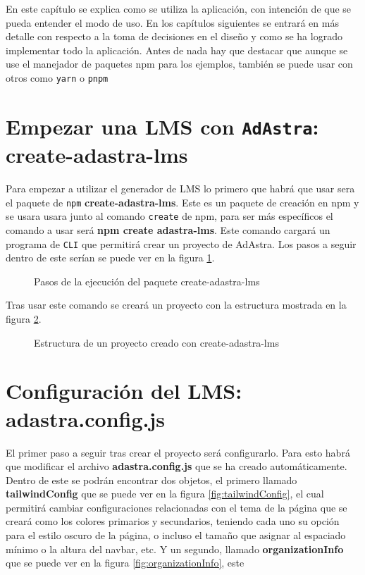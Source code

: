 En este capítulo se explica como se utiliza la aplicación, con intención de que se pueda entender el modo de uso. En los capítulos siguientes se entrará en más detalle con respecto a la toma de decisiones en el diseño y como se ha logrado implementar todo la aplicación. Antes de nada hay que destacar que aunque se use el manejador de paquetes npm para los ejemplos, también se puede usar con otros como \verb|yarn|\cite{yarn} o \verb|pnpm|\cite{pnpm}

\section{Empezar una LMS con {\tt AdAstra}: create-adastra-lms}

Para empezar a utilizar el generador de LMS lo primero que habrá que usar sera el paquete de \verb|npm|\cite{npm} \textbf{create-adastra-lms}. Este es un paquete de creación en npm y se usara usara junto al comando \verb|create|\cite{create-npm} de npm, para ser más específicos el comando a usar será \textbf{npm create adastra-lms}. Este comando cargará un programa de \verb|CLI|\cite{cli} que permitirá crear un proyecto de AdAstra. Los pasos a seguir dentro de este serían se puede ver en la figura \ref{fig:create-adastra}.

\begin{figure}
    \centering
    \makebox[\textwidth][c]{\texttt{[image: ]}}
    \caption{Pasos de la ejecución del paquete create-adastra-lms}
    \label{fig:create-adastra}
\end{figure}

Tras usar este comando se creará un proyecto con la estructura mostrada en la figura \ref{fig:adastra-structure}.

\begin{figure}
    \centering
    \makebox[\textwidth][c]{\texttt{[image: ]}}
    \caption{Estructura de un proyecto creado con create-adastra-lms}
    \label{fig:adastra-structure}
\end{figure}

\section{Configuración del LMS: adastra.config.js}

El primer paso a seguir tras crear el proyecto será configurarlo. Para esto habrá que modificar el archivo \textbf{adastra.config.js} que se ha creado automáticamente. Dentro de este se podrán encontrar dos objetos, el primero llamado \textbf{tailwindConfig} que se puede ver en la figura \ref{fig:tailwindConfig}, el cual permitirá cambiar configuraciones relacionadas con el tema de la página que se creará como los colores primarios y secundarios, teniendo cada uno su opción para el estilo oscuro de la página, o incluso el tamaño que asignar al espaciado mínimo o la altura del navbar, etc. Y un segundo, llamado \textbf{organizationInfo} que se puede ver en la figura \ref{fig:organizationInfo}, este 

